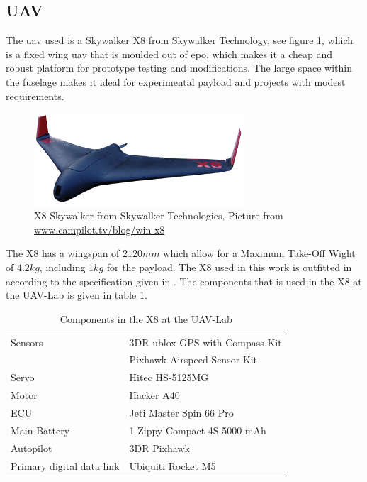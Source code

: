 \subsection{UAV}\label{ss:SkywalkerX8}
The \gls{uav} used is a Skywalker X8 from Skywalker Technology, see figure \ref{figure:skywalkerX8}, which is a fixed wing \acrfull{uav} that is moulded out of \gls{epo}, which makes it a cheap and robust platform for prototype testing and modifications. The large space within the fuselage makes it ideal for experimental payload and projects with modest requirements.
\begin{figure}[H]
	\centering
		\includegraphics[width=0.7\textwidth]{figs/Wing-X8_white-bgd2.png}
		\caption{X8 Skywalker from Skywalker Technologies, Picture from \url{www.campilot.tv/blog/win-x8}}
		\label{figure:skywalkerX8}
\end{figure}
The X8 has a wingspan of $2120mm$ which allow for a Maximum Take-Off Wight of $4.2kg$, including $1kg$ for the payload. The X8 used in this work is outfitted in according to the specification given in \citep{KlausenX8}. The components that is used in the X8 at the UAV-Lab is given in table \ref{tb:X8Components}.
\begin{table}[H]
\begin{center}
\begin{tabular}{l l}
Sensors & 3DR ublox GPS with Compass Kit\\&Pixhawk Airspeed Sensor Kit \\
Servo & Hitec HS-5125MG \\
Motor & Hacker A40 \\
ECU & Jeti Master Spin 66 Pro \\
Main Battery & 1 Zippy Compact 4S 5000 mAh\\
Autopilot & 3DR Pixhawk \\
Primary digital data link & Ubiquiti Rocket M5
\end{tabular}
\end{center}
\caption{Components in the X8 at the UAV-Lab}
\label{tb:X8Components}
\end{table}
